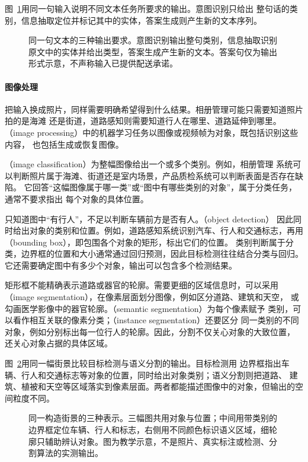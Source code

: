 图~\ref{fig:nlp-task-examples}用同一句输入说明不同文本任务所要求的输出。意图识别只给出
整句话的类别，信息抽取定位并标记其中的实体，答案生成则产生新的文本序列。

\begin{figure}[htbp]
  \centering
  
  \caption{同一句文本的三种输出要求。意图识别输出整句类别，信息抽取识别原文中的实体并给出类型，答案生成产生新的文本。答案句仅为输出形式示意，不声称输入已提供配送承诺。}
  \label{fig:nlp-task-examples}
\end{figure}

\paragraph{图像处理}
把输入换成照片，同样需要明确希望得到什么结果。相册管理可能只需要知道照片拍的是海滩
还是街道，道路感知则需要知道行人在哪里、道路延伸到哪里。
（image processing）中的机器学习任务以图像或视频帧为对象，既包括识别这些内容，
也包括生成或恢复图像。

（image classification）为整幅图像给出一个或多个类别。例如，相册管理
系统可以判断照片属于海滩、街道还是室内场景，产品质检系统可以判断表面是否存在缺陷。
它回答“这幅图像属于哪一类”或“图中有哪些类别的对象”，属于分类任务，通常不要求指出
每个对象的具体位置。

只知道图中“有行人”，不足以判断车辆前方是否有人。（object detection）
因此同时给出对象的类别和位置。例如，道路感知系统识别汽车、行人和交通标志，再用
（bounding box），即包围各个对象的矩形，标出它们的位置。
类别判断属于分类，边界框的位置和大小通常通过回归预测，因此目标检测往往结合分类与回归。
它还需要确定图中有多少个对象，输出可以包含多个检测结果。

矩形框不能精确表示道路或器官的轮廓。需要更细的区域信息时，可以采用
（image segmentation），在像素层面划分图像，例如区分道路、建筑和天空，
或勾画医学影像中的器官轮廓。（semantic segmentation）为每个像素赋予
类别，可以看作相互关联的像素分类；（instance segmentation）还要区分
同一类别的不同对象，例如分别标出每一位行人的轮廓。因此，分割不仅关心对象的大致位置，
还关心对象占据的具体区域。

图~\ref{fig:vision-task-examples}用同一幅街景比较目标检测与语义分割的输出。目标检测用
边界框指出车辆、行人和交通标志等对象的位置，同时给出对象类别；语义分割则把道路、
建筑、植被和天空等区域落实到像素层面。两者都能描述图像中的对象，但输出的空间粒度不同。

\begin{figure}[t]
  \centering
  
  \caption{同一构造街景的三种表示。三幅图共用对象与位置；中间用带类别的边界框定位车辆、行人和标志，右侧用不同颜色标识语义区域，细轮廓只辅助辨认对象。图为教学示意，不是照片、真实标注或检测、分割算法的实测输出。}
  \label{fig:vision-task-examples}
\end{figure}
\FloatBarrier

